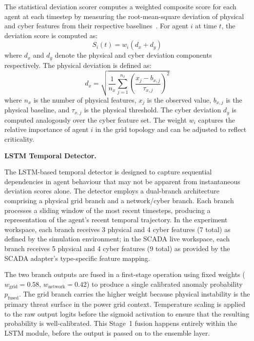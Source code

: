 \par \vspace{0.2cm}
The statistical deviation scorer computes a weighted composite score for each agent at each timestep by measuring the root-mean-square deviation of physical and cyber features from their respective baselines~\cite{priyadarsini2025}. For agent $i$ at time $t$, the deviation score is computed as:
\begin{equation}
S_{i}(t) = w_{i} \left( d_{x} + d_{y} \right)
\label{eq:deviation_score}
\end{equation}
where $d_{x}$ and $d_{y}$ denote the physical and cyber deviation components respectively. The physical deviation is defined as:
\begin{equation}
d_{x} = \sqrt{ \frac{1}{n_{x}} \sum_{j=1}^{n_{x}} \left( \frac{x_{j} - b_{x,j}}{\tau_{x,j}} \right)^{2} }
\label{eq:physical_deviation}
\end{equation}
where $n_{x}$ is the number of physical features, $x_{j}$ is the observed value, $b_{x,j}$ is the physical baseline, and $\tau_{x,j}$ is the physical threshold. The cyber deviation $d_{y}$ is computed analogously over the cyber feature set. The weight $w_{i}$ captures the relative importance of agent $i$ in the grid topology and can be adjusted to reflect criticality.

\par \vspace{0.35cm}
\textbf{LSTM Temporal Detector.}

\par \vspace{0.2cm}
The LSTM-based temporal detector is designed to capture sequential dependencies in agent behaviour that may not be apparent from instantaneous deviation scores alone. The detector employs a dual-branch architecture comprising a physical grid branch and a network/cyber branch. Each branch processes a sliding window of the most recent timesteps, producing a representation of the agent's recent temporal trajectory. In the experiment workspace, each branch receives 3 physical and 4 cyber features (7 total) as defined by the simulation environment; in the SCADA live workspace, each branch receives 5 physical and 4 cyber features (9 total) as provided by the SCADA adapter's type-specific feature mapping.

\par \vspace{0.2cm}
The two branch outputs are fused in a first-stage operation using fixed weights ($w_{\text{grid}} = 0.58$, $w_{\text{network}} = 0.42$) to produce a single calibrated anomaly probability $p_{\text{fused}}$. The grid branch carries the higher weight because physical instability is the primary threat surface in the power grid context. Temperature scaling is applied to the raw output logits before the sigmoid activation to ensure that the resulting probability is well-calibrated. This Stage~1 fusion happens entirely within the LSTM module, before the output is passed on to the ensemble layer.

